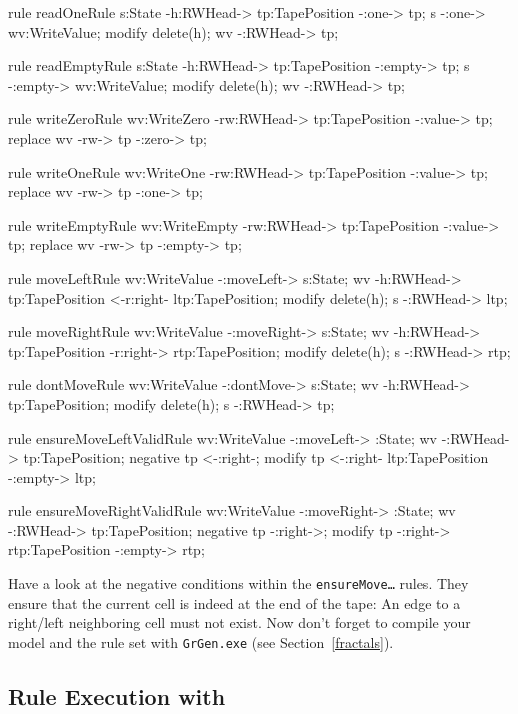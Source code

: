 \begin{grgen}[firstnumber=last]
rule readOneRule {
	s:State -h:RWHead-> tp:TapePosition -:one-> tp;
	s -:one-> wv:WriteValue;
	modify {
		delete(h);
		wv -:RWHead-> tp;
	}
}

rule readEmptyRule {
	s:State -h:RWHead-> tp:TapePosition -:empty-> tp;
	s -:empty-> wv:WriteValue;
	modify {
		delete(h);
		wv -:RWHead-> tp;
	}
}

rule writeZeroRule {
	wv:WriteZero -rw:RWHead-> tp:TapePosition -:value-> tp;
	replace {
		wv -rw-> tp -:zero-> tp;
	}
}

rule writeOneRule {
	wv:WriteOne -rw:RWHead-> tp:TapePosition -:value-> tp;
	replace {
		wv -rw-> tp -:one-> tp;
	}
}

rule writeEmptyRule {
	wv:WriteEmpty -rw:RWHead-> tp:TapePosition -:value-> tp;
	replace {
		wv -rw-> tp -:empty-> tp;
	}
}

rule moveLeftRule {
	wv:WriteValue -:moveLeft-> s:State;
	wv -h:RWHead-> tp:TapePosition <-r:right- ltp:TapePosition;
	modify {
		delete(h);
		s -:RWHead-> ltp;
	}
}

rule moveRightRule {
	wv:WriteValue -:moveRight-> s:State;
	wv -h:RWHead-> tp:TapePosition -r:right-> rtp:TapePosition;
	modify {
		delete(h);
		s -:RWHead-> rtp;
	}
}

rule dontMoveRule {
	wv:WriteValue -:dontMove-> s:State;
	wv -h:RWHead-> tp:TapePosition;
	modify {
		delete(h);
		s -:RWHead-> tp;
	}
}

rule ensureMoveLeftValidRule {
	wv:WriteValue -:moveLeft-> :State;
	wv -:RWHead-> tp:TapePosition;
	negative {
		tp <-:right-;
	}
	modify {
		tp <-:right- ltp:TapePosition -:empty-> ltp;
	}
}

rule ensureMoveRightValidRule {
	wv:WriteValue -:moveRight-> :State;
	wv -:RWHead-> tp:TapePosition;
	negative {
		tp -:right->;
	}
	modify {
		tp -:right-> rtp:TapePosition -:empty-> rtp;
	}
}
\end{grgen}

Have a look at the negative conditions within the \texttt{ensureMove\dots} rules.
They ensure that the current cell is indeed at the end of the tape: An edge to a right/left neighboring cell must not exist. 
Now don't forget to compile your model and the rule set with \texttt{GrGen.exe} (see Section~\ref{fractals}).

\subsection{Rule Execution with \GrShell}

